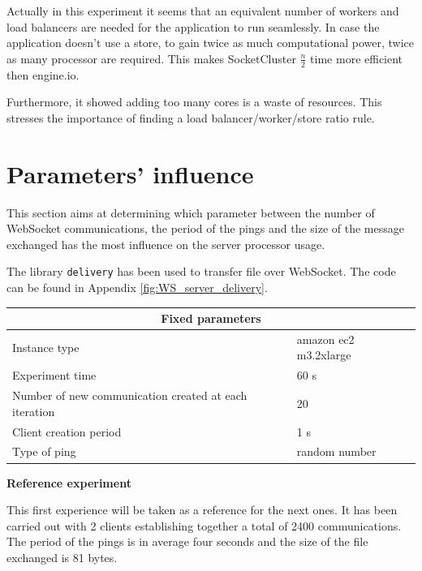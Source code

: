 \newpage

Actually in this experiment it seems that an equivalent number of workers and
load balancers are needed for the application to run seamlessly. In case the
application doesn't use a store, to gain twice as much computational power, twice
as many processor are required. This makes SocketCluster $\frac{n}{2}$ time
more efficient then engine.io.

Furthermore, it showed adding too many cores is a waste of resources. This
stresses the importance of finding a load balancer/worker/store ratio rule.

\section{Parameters' influence}

This section aims at determining which parameter between the number of
WebSocket communications, the period of the pings and the size of the message
exchanged has the most influence on the server processor usage. 

The library \texttt{delivery} has been used to transfer file over WebSocket.
The code can be found in Appendix \ref{fig:WS_server_delivery}.

\begin{center}
  \begin{tabular}{ | l | l |}
  \hline
  \multicolumn{2}{|c|}{Fixed parameters} \\
  \hline
    Instance type &  amazon ec2 m3.2xlarge\\ 
    Experiment time & 60 s \\
    Number of new communication created at each iteration & 20 \\
    Client creation period & 1 s \\
    Type of ping & random number \\ 
  \hline
  \end{tabular}
\end{center}

\newpage

\textbf{Reference experiment}

This first experience will be taken as a reference for the next ones. It has
been carried out with 2 clients establishing together a total of 2400
communications. The period of the pings is in average four seconds and the
size of the file exchanged is 81 bytes.

